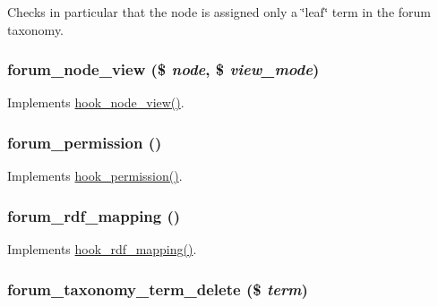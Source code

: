 Checks in particular that the node is assigned only a \char`\"{}leaf\char`\"{} term in the forum taxonomy. \hypertarget{forum_8module_a76349348d79c1557db47ffe253587ffd}{
\subsubsection[{forum\_\-node\_\-view}]{\setlength{\rightskip}{0pt plus 5cm}forum\_\-node\_\-view (\$ {\em node}, \/  \$ {\em view\_\-mode})}}
\label{forum_8module_a76349348d79c1557db47ffe253587ffd}
Implements \hyperlink{group__node__api__hooks_ga475290ee8e81a2373ea17c512cc3f9a9}{hook\_\-node\_\-view()}. \hypertarget{forum_8module_a804aa1e2b5a5ab5c05524c9289cc9a9e}{
\subsubsection[{forum\_\-permission}]{\setlength{\rightskip}{0pt plus 5cm}forum\_\-permission ()}}
\label{forum_8module_a804aa1e2b5a5ab5c05524c9289cc9a9e}
Implements \hyperlink{group__hooks_ga2b22b45f4925f2478412477bae329713}{hook\_\-permission()}. \hypertarget{forum_8module_a6212a58d7fdabaa8ed8f8b21f4f53dcd}{
\subsubsection[{forum\_\-rdf\_\-mapping}]{\setlength{\rightskip}{0pt plus 5cm}forum\_\-rdf\_\-mapping ()}}
\label{forum_8module_a6212a58d7fdabaa8ed8f8b21f4f53dcd}
Implements \hyperlink{group__rdf_gae3e7f047bdcb9309b323e2af09966765}{hook\_\-rdf\_\-mapping()}. \hypertarget{forum_8module_a4fa90e2df492cc84662faa0f2742fa71}{
\subsubsection[{forum\_\-taxonomy\_\-term\_\-delete}]{\setlength{\rightskip}{0pt plus 5cm}forum\_\-taxonomy\_\-term\_\-delete (\$ {\em term})}}
